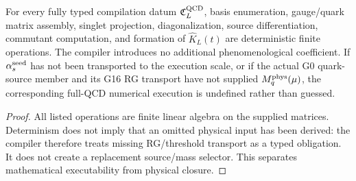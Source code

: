 \documentclass[12pt,a4paper]{article}
\providecommand{\alphasseed}{\alpha_s^{\rm seed}}
\begin{document}
\begin{theorem}
\label{p10:thm:finite-qcd-matrix-compiler}
For every fully typed compilation datum \(\mathfrak C_L^{\rm QCD}\), basis enumeration, gauge/quark matrix assembly, singlet projection, diagonalization, source differentiation, commutant computation, and formation of \(\widehat K_L(t)\) are deterministic finite operations.  The compiler introduces no additional phenomenological coefficient.  If \(\alphasseed\) has not been transported to the execution scale, or if the actual G0 quark-source member and its G16 RG transport have not supplied \(M_q^{\rm phys}(\mu)\), the corresponding full-QCD numerical execution is undefined rather than guessed.
\end{theorem}
\begin{proof}
All listed operations are finite linear algebra on the supplied matrices.  Determinism does not imply that an omitted physical input has been derived: the compiler therefore treats missing RG/threshold transport as a typed obligation.  It does not create a replacement source/mass selector.  This separates mathematical executability from physical closure.
\end{proof}
\end{document}
